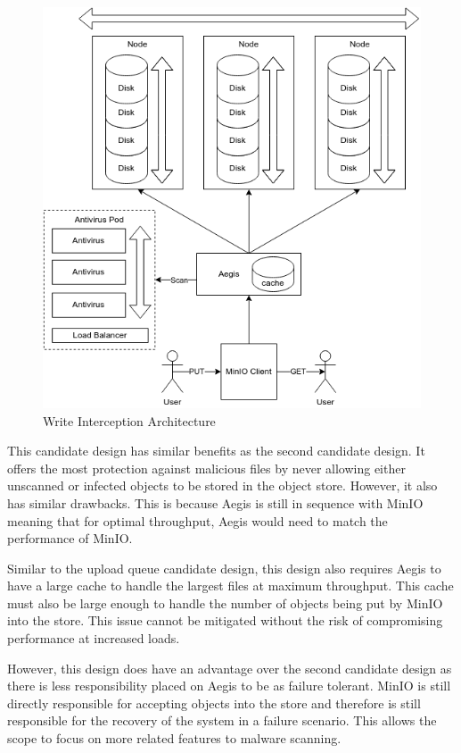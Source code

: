 \documentclass[12pt, conference, final, a4paper, onecolumn, compsoc]{IEEEtran}
\begin{document}
\begin{figure}
  \centering \includegraphics[scale=.3]{diagrams/write-intercept.png}
  \caption{Write Interception Architecture}
  \label{fig:writeInterceptArch}
\end{figure}

This candidate design has similar benefits as the second candidate design. It
offers the most protection against malicious files by never allowing either
unscanned or infected objects to be stored in the object store. However, it also
has similar drawbacks. This is because Aegis is still in sequence with MinIO
meaning that for optimal throughput, Aegis would need to match the performance
of MinIO.

Similar to the upload queue candidate design, this design also requires Aegis to
have a large cache to handle the largest files at maximum throughput. This cache
must also be large enough to handle the number of objects being put by MinIO
into the store. This issue cannot be mitigated without the risk of compromising
performance at increased loads.

However, this design does have an advantage over the second candidate design as
there is less responsibility placed on Aegis to be as failure tolerant. MinIO is
still directly responsible for accepting objects into the store and therefore is
still responsible for the recovery of the system in a failure scenario. This
allows the scope to focus on more related features to malware scanning.
\end{document}
